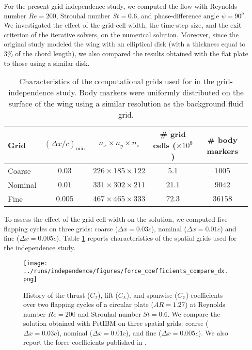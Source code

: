 For the present grid-independence study, we computed the flow with Reynolds number $Re = 200$, Strouhal number $St = 0.6$, and phase-difference angle $\psi = 90^o$.
We investigated the effect of the grid-cell width, the time-step size, and the exit criterion of the iterative solvers, on the numerical solution.
Moreover, since the original study modeled the wing with an elliptical disk (with a thickness equal to $3\%$ of the chord length), we also compared the results obtained with the flat plate to those using a similar disk.

\begin{table}
  \centering
  \begin{tabular}{lcccc}
    \hline\hline
    Grid & $(\Delta x / c)_\text{min}$ & $n_x \times n_y \times n_z$ & \# grid cells ($\times 10^6$) & \# body markers \\
    \hline
    Coarse & $0.03$ & $226 \times 185 \times 122$ & $5.1$ & $1005$ \\
    Nominal & $0.01$ & $331 \times 302 \times 211$ & $21.1$ & $9042$ \\
    Fine & $0.005$ & $467 \times 465 \times 333$ & $72.3$ & $36158$ \\
    \hline\hline
  \end{tabular}
  \caption{Characteristics of the computational grids used for in the grid-independence study. Body markers were uniformly distributed on the surface of the wing using a similar resolution as the background fluid grid.}
  \label{tab:independence_grid_charateristics}
\end{table}

To assess the effect of the grid-cell width on the solution, we computed five flapping cycles on three grids: coarse ($\Delta x = 0.03c$), nominal ($\Delta x = 0.01c$) and fine ($\Delta x = 0.005c$).
Table \ref{tab:independence_grid_charateristics} reports characteristics of the spatial grids used for the independence study.

\begin{figure}
  \centering
  \texttt{[image: ../runs/independence/figures/force\_coefficients\_compare\_dx.png]}
  \caption{History of the thrust ($C_T$), lift ($C_L$), and spanwise ($C_Z$) coefficients over two flapping cycles of a circular plate ($AR = 1.27$) at Reynolds number $Re = 200$ and Strouhal number $St = 0.6$. We compare the solution obtained with PetIBM on three spatial grids: coarse ($\Delta x = 0.03c$), nominal ($\Delta x = 0.01c$), and fine ($\Delta x = 0.005c$). We also report the force coefficients published in \citet{li_dong_2016}.}
  \label{fig:independence_force_coefficients_dx}
\end{figure}

